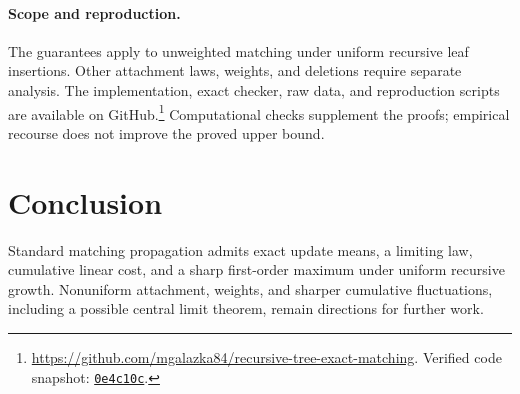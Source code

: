 \documentclass[runningheads,envcountsame,orivec]{llncs}
\begin{document}
\paragraph{Scope and reproduction.}
The guarantees apply to unweighted matching under uniform recursive
leaf insertions. Other attachment laws, weights, and deletions require
separate analysis. The implementation, exact checker, raw data, and
reproduction scripts are available on GitHub.\footnote{\url{https://github.com/mgalazka84/recursive-tree-exact-matching}.
Verified code snapshot: \href{https://github.com/mgalazka84/recursive-tree-exact-matching/tree/0e4c10c707699f61ca2e83cd28de8ca4683ef03d}{\texttt{0e4c10c}}.} Computational
checks supplement the proofs; empirical recourse does not improve the
proved upper bound.

\section{Conclusion}

Standard matching propagation admits exact update means, a limiting
law, cumulative linear cost, and a sharp first-order maximum under
uniform recursive growth. Nonuniform attachment, weights, and sharper
cumulative fluctuations, including a possible central limit theorem,
remain directions for further work.
\end{document}
